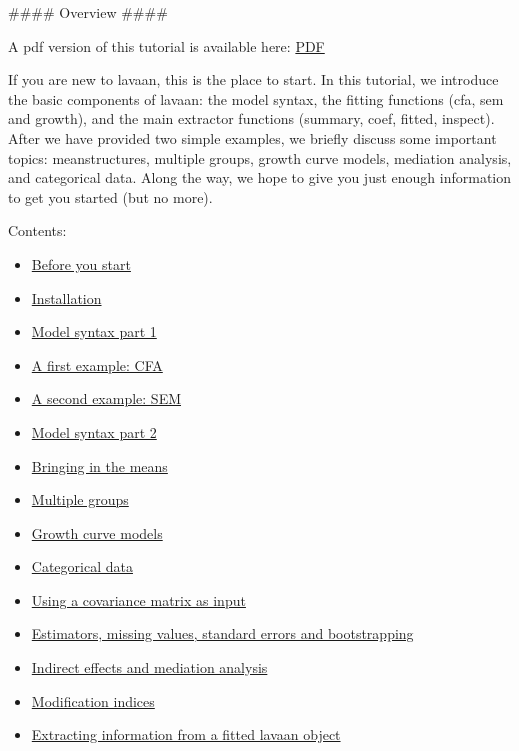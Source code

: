 \#\#\#\# Overview \#\#\#\#

A pdf version of this tutorial is available here:
\href{/tutorial/tutorial.pdf}{PDF}

If you are new to lavaan, this is the place to start. In this tutorial,
we introduce the basic components of lavaan: the model syntax, the
fitting functions (cfa, sem and growth), and the main extractor
functions (summary, coef, fitted, inspect). After we have provided two
simple examples, we briefly discuss some important topics:
meanstructures, multiple groups, growth curve models, mediation
analysis, and categorical data. Along the way, we hope to give you just
enough information to get you started (but no more).

Contents:

\begin{itemize}
\itemsep1pt\parskip0pt
\item
  \href{/tutorial/before.html}{Before you start}
\item
  \href{/tutorial/install.html}{Installation}
\item
  \href{/tutorial/syntax1.html}{Model syntax part 1}
\item
  \href{/tutorial/cfa.html}{A first example: CFA}
\item
  \href{/tutorial/sem.html}{A second example: SEM}
\item
  \href{/tutorial/syntax2.html}{Model syntax part 2}
\item
  \href{/tutorial/means.html}{Bringing in the means}
\item
  \href{/tutorial/groups.html}{Multiple groups}
\item
  \href{/tutorial/growth.html}{Growth curve models}
\item
  \href{/tutorial/cat.html}{Categorical data}
\item
  \href{/tutorial/cov.html}{Using a covariance matrix as input}
\item
  \href{/tutorial/est.html}{Estimators, missing values, standard errors
  and bootstrapping}
\item
  \href{/tutorial/mediation.html}{Indirect effects and mediation
  analysis}
\item
  \href{/tutorial/modindices.html}{Modification indices}
\item
  \href{/inspect.html}{Extracting information from a fitted lavaan
  object}
\end{itemize}
